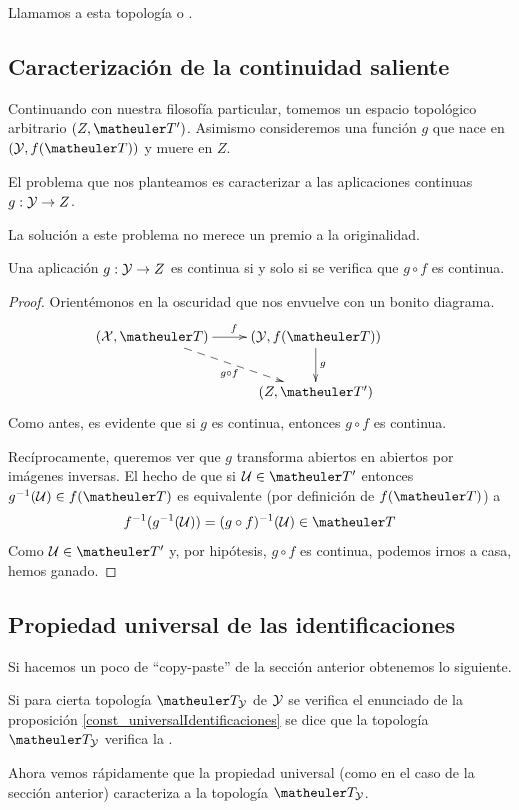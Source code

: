 Llamamos a esta topología  o .

\subsection{Caracterización de la continuidad saliente}
Continuando con nuestra filosofía particular, tomemos un espacio topológico arbitrario $(Z,\T')$. Asimismo consideremos una función $g$ que nace en $(\Y,f(\T))$ y muere en $Z$.

El problema que nos planteamos es caracterizar a las aplicaciones continuas $g:\mathcal{Y}\to Z$.

La solución a este problema no merece un premio a la originalidad.
\begin{prop}
	\label{const_universalIdentificaciones}
	Una aplicación $g:\mathcal{Y}\to Z$ es continua si y solo si se verifica que $g\circ f$ es continua.
\end{prop}
\begin{proof}
	Orientémonos en la oscuridad que nos envuelve con un bonito diagrama.
	\begin{equation*}
		\xymatrix{
			(\X,\T) \ar[r]^f \ar@{-->}[rd]_{g\circ f} &
			(\Y,f(\T)) \ar[d]^g & \\
			&(Z,\T')
		}
	\end{equation*}
	Como antes, es evidente que si $g$ es continua, entonces $g\circ f$ es continua.
	
	Recíprocamente, queremos ver que $g$ transforma abiertos en abiertos por imágenes inversas. El hecho de que si $\U\in\T'$ entonces $g^{-1}(\U)\in f(\T)$ es equivalente (por definición de $f(\T)$) a
	\[f^{-1}(g^{-1}(\U))=(g\circ f)^{-1}(\U)\in\T\]
	Como $\U\in\T'$ y, por hipótesis, $g\circ f$ es continua, podemos irnos a casa, hemos ganado.
\end{proof}
\subsection{Propiedad universal de las identificaciones}
Si hacemos un poco de ``copy-paste'' de la sección anterior obtenemos lo siguiente. 
\begin{defi}
	Si para cierta topología $\T_\Y$ de $\mathcal{Y}$ se verifica el enunciado de la proposición \ref{const_universalIdentificaciones} se dice que la topología $\T_\Y$ verifica la .
\end{defi}
Ahora vemos rápidamente que la propiedad universal (como en el caso de la sección anterior) caracteriza a la topología $\T_\Y$.

